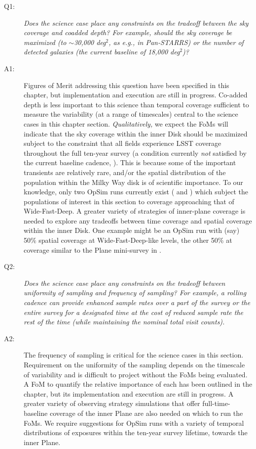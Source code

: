 \begin{description}

 \item[Q1:] {\it Does the science case place any constraints on the
 tradeoff between the sky coverage and coadded depth? For example, should
 the sky coverage be maximized (to $\sim$30,000 deg$^2$, as e.g., in
 Pan-STARRS) or the number of detected galaxies (the current baseline 
 of 18,000 deg$^2$)?}

 \item[A1:] Figures of Merit addressing this question have been
   specified in this chapter, but implementation and execution are
   still in progress. Co-added depth is less important to this science
   than temporal coverage sufficient to measure the variability (at a
   range of timescales) central to the science cases in this chapter
   section. {\it Qualitatively,} we expect the FoMs will indicate that
   the sky coverage within the inner Disk should be maximized subject
   to the constraint that all fields experience LSST coverage
   throughout the full ten-year survey (a condition currently {\it
     not} satisfied by the current baseline cadence,
   ). This is because some of the important
   transients are relatively rare, and/or the spatial distribution of
   the population within the Milky Way disk is of scientific
   importance. To our knowledge, only two OpSim runs currently exist
   ( and )
   which subject the populations of interest in this section to
   coverage approaching that of Wide-Fast-Deep. A greater variety of
   strategies of inner-plane coverage is needed to explore any
   tradeoffs between time coverage and spatial coverage within the
   inner Disk. One example might be an OpSim run with (say) 50\%
   spatial coverage at Wide-Fast-Deep-like levels, the other 50\% at
   coverage similar to the Plane mini-survey in
   .

 \item[Q2:] {\it Does the science case place any constraints on the
 tradeoff between uniformity of sampling and frequency of  sampling? For
 example, a rolling cadence can provide enhanced sample rates over a part
 of the survey or the entire survey for a designated time at the cost of
 reduced sample rate the rest of the time (while maintaining the nominal
 total visit counts).}

\item[A2:] The frequency of sampling is critical for the science
  cases in this section. Requirement on the uniformity of the sampling
  depends on the timescale of variability and is difficult to project
  without the FoMs being evaluated. A FoM to quantify the relative
  importance of each has been outlined in the chapter, but its
  implementation and execution are still in progress. A greater
  variety of observing strategy simulations that offer
  full-time-baseline coverage of the inner Plane are also needed on
  which to run the FoMs. We require suggestions for OpSim runs with a
  variety of temporal distributions of exposures within the ten-year
  survey lifetime, towards the inner Plane.


\end{description}
